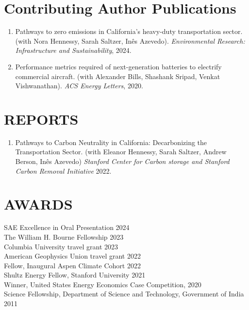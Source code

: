 \documentclass[centered, 11pt]{res}
\begin{document}
\begin{resume}
\section{Contributing Author Publications}
\begin{enumerate}
    \item Pathways to zero emissions in California's heavy-duty transportation sector.(with Nora Hennessy, Sarah Saltzer, In\^{e}s Azevedo). \textit{Environmental Research: Infrastructure and Sustainability}, 2024.
    \item Performance metrics required of next-generation batteries to electrify commercial aircraft. (with Alexander Bills, Shashank Sripad, Venkat Vishwanathan). \textit{ACS Energy Letters}, 2020.
\end{enumerate}
\section{REPORTS}
\begin{enumerate}
    \item Pathways to Carbon Neutrality in California: Decarbonizing the Transportation Sector. (with Eleanor Hennessy, Sarah Saltzer, Andrew Berson, In\^{e}s Azevedo) \textit{Stanford Center for
Carbon storage and Stanford Carbon Removal Initiative} 2022.
\end{enumerate}
\section{AWARDS}
SAE Excellence in Oral Presentation 2024\\
The William H. Bourne Fellowship 2023\\
Columbia University travel grant 2023\\
American Geophysics Union travel grant 2022\\
Fellow, Inaugural Aspen Climate Cohort 2022\\
Shultz Energy Fellow, Stanford University 2021\\
Winner, United States Energy Economics Case Competition, 2020\\
Science Fellowship, Department of Science and Technology, Government of India 2011

\end{resume}
\end{document}
